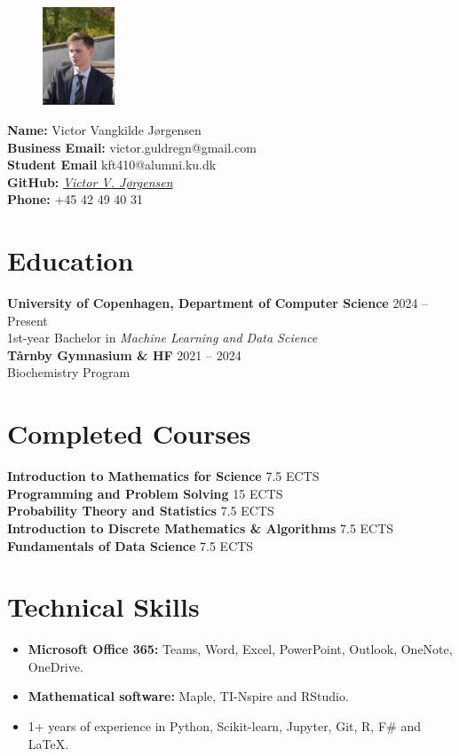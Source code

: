 \documentclass[a4paper,10pt]{article}
\makeatletter
\newcommand{\name}{Victor Vangkilde Jørgensen}
\newcommand{\phone}{+45 42 49 40 31}
\newcommand{\emailBusiness}{victor.guldregn@gmail.com}
\newcommand{\emailStudent}{kft410@alumni.ku.dk}
\makeatother
\begin{document}
\begin{figure}[h!]
    \centering
    \includegraphics[width=0.19\textwidth, trim={3cm 2cm 1.5cm 4cm}, clip, cfbox=gr 1.25pt 0pt]{profilbillede.jpg}
\end{figure}

\noindent
\textbf{Name:} \name\\
\textbf{Business Email:} \emailBusiness\\
\textbf{Student Email} \emailStudent\\
\textbf{GitHub:} \href{https://github.com/P1N60}{\textit{Victor V. Jørgensen}}\\
\textbf{Phone:} \phone
\n
\section*{Education}
\textbf{University of Copenhagen, Department of Computer Science} \hfill 2024 -- Present \\
1st-year Bachelor in \textit{Machine Learning and Data Science}\\
\textbf{T\aa rnby Gymnasium \& HF} \hfill 2021 -- 2024\\ 
Biochemistry Program
\n
\section*{Completed Courses}
\textbf{Introduction to Mathematics for Science} \hfill 7.5 ECTS\\
\textbf{Programming and Problem Solving} \hfill 15 ECTS\\
\textbf{Probability Theory and Statistics} \hfill 7.5 ECTS\\
\textbf{Introduction to Discrete Mathematics \& Algorithms} \hfill 7.5 ECTS\\ 
\textbf{Fundamentals of Data Science} \hfill 7.5 ECTS
\n
\section*{Technical Skills}
\begin{itemize}[noitemsep, topsep=0pt]
    \item \textbf{Microsoft Office 365:} Teams, Word, Excel, PowerPoint, Outlook, OneNote, OneDrive. 
    \item \textbf{Mathematical software:} Maple, TI-Nspire and RStudio.
    \item 1+ years of experience in Python, Scikit-learn, Jupyter, Git, R, F\# and \LaTeX.
\end{itemize}
\n
\end{document}
